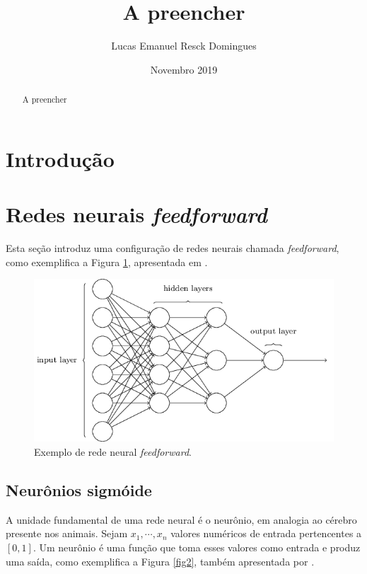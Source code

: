 \documentclass{article}
\title{A preencher}
\author{Lucas Emanuel Resck Domingues}
\date{Novembro 2019}
\begin{document}
    \maketitle

    \begin{abstract}
        A preencher
    \end{abstract}

    \section{Introdução}

    \section{Redes neurais \textit{feedforward}}

        Esta seção introduz uma configuração de redes neurais chamada \textit{feedforward}, como exemplifica a Figura \ref{fig1}, apresentada em \cite{nielsen2015neural}.

        \begin{figure}[h!]
            \centering
            \includegraphics[scale=0.5]{Images/Feedforward neural network.png}
            \caption{Exemplo de rede neural \textit{feedforward}.}
            \label{fig1}
        \end{figure}        

        \subsection{Neurônios sigmóide}

            A unidade fundamental de uma rede neural é o neurônio, em analogia ao cérebro presente nos animais.
            Sejam $x_1, \cdots, x_n$ valores numéricos de entrada pertencentes a $[0, 1]$.
            Um neurônio é uma função que toma esses valores como entrada e produz uma saída, como exemplifica a Figura \ref{fig2}, também apresentada por \cite{nielsen2015neural}.
\end{document}

